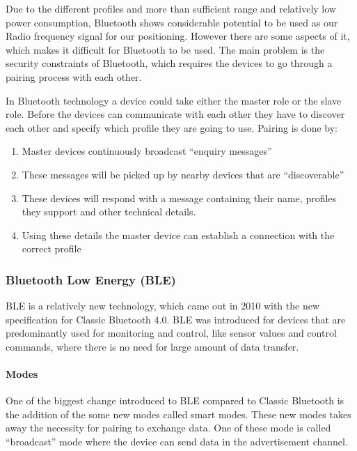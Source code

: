 Due to the different profiles and more than sufficient range and relatively
low power consumption, Bluetooth shows considerable potential to be
used as our Radio frequency signal for our positioning. However there are
some aspects of it, which makes it difficult for Bluetooth to be used.
The main problem is the security constraints of Bluetooth, which requires
the devices to go through a pairing process with each other. 

In Bluetooth technology a device could take either the master role
or the slave role. Before the devices can communicate with each other
they have to discover each other and specify which profile they are
going to use. Pairing is done by: 
\begin{enumerate}
\item Master devices continuously broadcast \textquotedblleft enquiry messages\textquotedblright{}
\item These messages will be picked up by nearby devices that are \textquotedblleft discoverable\textquotedblright{} 
\item These devices will respond with a message containing their name, profiles
they support and other technical details. 
\item Using these details the master device can establish a connection with
the correct profile 
\end{enumerate}

\subsubsection{Bluetooth Low Energy (BLE)}

BLE is a relatively new technology, which came out in 2010 with the
new specification for Classic Bluetooth 4.0\cite{ble-wiki}. BLE was introduced for
devices that are predominantly used for monitoring and control, like
sensor values and control commands, where there is no need for large
amount of data transfer.


\paragraph*{Modes\protect \\
}

One of the biggest change introduced to BLE compared to Classic Bluetooth is the addition of the some new modes called smart modes\cite{bluetooth-chalmers}. These new modes takes
away the necessity for pairing to exchange data. One of these mode is called \textquotedblleft broadcast\textquotedblright{}
mode where the device can send data in the advertisement channel\cite{ble-modes}. 

